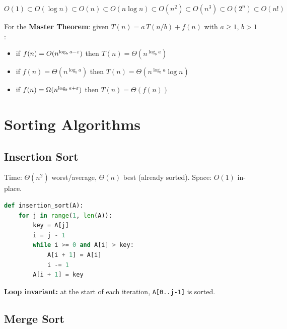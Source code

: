 \documentclass[11pt,a4paper,openany]{book}
\begin{document}
\begin{propbox}[title=Common growth rates (slowest to fastest)]
\[
  O(1) \subset O(\log n) \subset O(n) \subset O(n\log n) \subset O(n^2)
  \subset O(n^3) \subset O(2^n) \subset O(n!)
\]
\end{propbox}

\begin{rembox}
For the \textbf{Master Theorem}: given $T(n) = a\,T(n/b) + f(n)$ with $a \geq 1$, $b > 1$:
\begin{itemize}
  \item if $f(n) = O(n^{\log_b a - \varepsilon})$ then $T(n) = \Theta(n^{\log_b a})$
  \item if $f(n) = \Theta(n^{\log_b a})$ then $T(n) = \Theta(n^{\log_b a} \log n)$
  \item if $f(n) = \Omega(n^{\log_b a + \varepsilon})$ then $T(n) = \Theta(f(n))$
\end{itemize}
\end{rembox}

\section{Sorting Algorithms}

\subsection{Insertion Sort}

\begin{propbox}[title=Complexity]
Time: $\Theta(n^2)$ worst/average, $\Theta(n)$ best (already sorted). \quad Space: $O(1)$ in-place.
\end{propbox}

\begin{lstlisting}[language=Python]
def insertion_sort(A):
    for j in range(1, len(A)):
        key = A[j]
        i = j - 1
        while i >= 0 and A[i] > key:
            A[i + 1] = A[i]
            i -= 1
        A[i + 1] = key
\end{lstlisting}

\textbf{Loop invariant:} at the start of each iteration, \texttt{A[0..j-1]} is sorted.

\subsection{Merge Sort}
\end{document}
